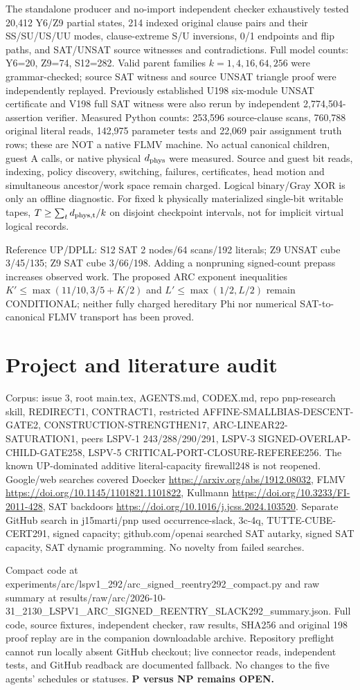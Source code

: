 \documentclass{article}
\begin{document}
The standalone producer and no-import independent checker exhaustively tested 20,412 Y6/Z9 partial states, 214 indexed original clause pairs and their SS/SU/US/UU modes, clause-extreme S/U inversions, 0/1 endpoints and flip paths, and SAT/UNSAT source witnesses and contradictions. Full model counts: Y6=20, Z9=74, S12=282. Valid parent families $k=1,4,16,64,256$ were grammar-checked; source SAT witness and source UNSAT triangle proof were independently replayed. Previously established U198 six-module UNSAT certificate and V198 full SAT witness were also rerun by independent 2,774,504-assertion verifier. Measured Python counts: 253,596 source-clause scans, 760,788 original literal reads, 142,975 parameter tests and 22,069 pair assignment truth rows; these are NOT a native FLMV machine. No actual canonical children, guest A calls, or native physical $d_{\rm phys}$ were measured. Source and guest bit reads, indexing, policy discovery, switching, failures, certificates, head motion and simultaneous ancestor/work space remain charged. Logical binary/Gray XOR is only an offline diagnostic. For fixed k physically materialized single-bit writable tapes, $T\ge\sum_t d_{\rm phys,t}/k$ on disjoint checkpoint intervals, not for implicit virtual logical records.

Reference UP/DPLL: S12 SAT 2 nodes/64 scans/192 literals; Z9 UNSAT cube 3/45/135; Z9 SAT cube 3/66/198. Adding a nonpruning signed-count prepass increases observed work. The proposed ARC exponent inequalities $K'\le\max(11/10,3/5+K/2)$ and $L'\le\max(1/2,L/2)$ remain CONDITIONAL; neither fully charged hereditary Phi nor numerical SAT-to-canonical FLMV transport has been proved.

\section{Project and literature audit}
Corpus: issue 3, root main.tex, AGENTS.md, CODEX.md, repo pnp-research skill, REDIRECT1, CONTRACT1, restricted AFFINE-SMALLBIAS-DESCENT-GATE2, CONSTRUCTION-STRENGTHEN17, ARC-LINEAR22-SATURATION1, peers LSPV-1 243/288/290/291, LSPV-3 SIGNED-OVERLAP-CHILD-GATE258, LSPV-5 CRITICAL-PORT-CLOSURE-REFEREE256. The known UP-dominated additive literal-capacity firewall248 is not reopened. Google/web searches covered Doecker \url{https://arxiv.org/abs/1912.08032}, FLMV \url{https://doi.org/10.1145/1101821.1101822}, Kullmann \url{https://doi.org/10.3233/FI-2011-428}, SAT backdoors \url{https://doi.org/10.1016/j.jcss.2024.103520}. Separate GitHub search in j15marti/pnp used occurrence-slack, 3c-4q, TUTTE-CUBE-CERT291, signed capacity; github.com/openai searched SAT autarky, signed SAT capacity, SAT dynamic programming. No novelty from failed searches.

Compact code at experiments/arc/lspv1_292/arc_signed_reentry292_compact.py and raw summary at results/raw/arc/2026-10-31_2130_LSPV1_ARC_SIGNED_REENTRY_SLACK292_summary.json. Full code, source fixtures, independent checker, raw results, SHA256 and original 198 proof replay are in the companion downloadable archive. Repository preflight cannot run locally absent GitHub checkout; live connector reads, independent tests, and GitHub readback are documented fallback. No changes to the five agents' schedules or statuses. \textbf{P versus NP remains OPEN.}
\end{document}
